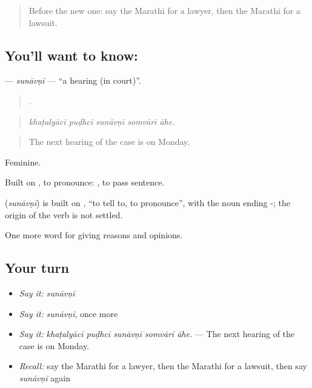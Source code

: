 \label{lesson:MR-C359-sunavni}



\begin{quote}
Before the new one: say the Marathi for a lawyer, then the Marathi for a lawsuit.
\end{quote}

\subsection*{You'll want to know: }
\textbf{} — \emph{sunāvṇī} — \textquotedblleft{}a hearing (in court)\textquotedblright{}.

\begin{quote}
    .
\end{quote}

\begin{quote}
\emph{khaṭalyācī puḍhcī sunāvṇī somvārī āhe.}
\end{quote}

\begin{quote}
The next hearing of the case is on Monday.
\end{quote}

Feminine.

Built on , to pronounce:  , to pass sentence.

\begin{cousinweb}
\textbf{} (\emph{sunāvṇī}) is built on , \textquotedblleft{}to tell to, to pronounce\textquotedblright{}, with the noun ending -; the origin of the verb is not settled.
\end{cousinweb}

\begin{grammarlens}[title={What you've built}]
One more word for giving reasons and opinions.
\end{grammarlens}

\subsection*{Your turn}
\begin{itemize}
\raggedright
  \item \emph{Say it:} \emph{sunāvṇī}
  \item \emph{Say it:} \emph{sunāvṇī}, once more
  \item \emph{Say it:} \emph{khaṭalyācī puḍhcī sunāvṇī somvārī āhe.} — The next hearing of the case is on Monday.
  \item \emph{Recall:} say the Marathi for a lawyer, then the Marathi for a lawsuit, then say \emph{sunāvṇī} again
\end{itemize}

